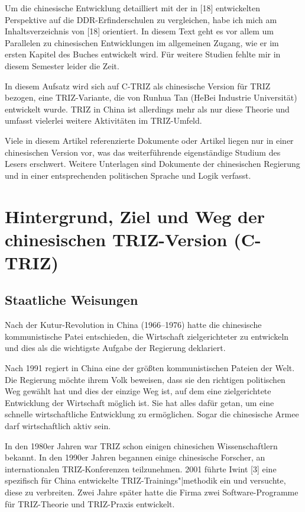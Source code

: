 \documentclass[11pt,a4paper]{article}
\begin{document}
Um die chinesische Entwicklung detailliert mit der in [18] entwickelten
Perspektive auf die DDR-Erfinderschulen zu vergleichen, habe ich mich am
Inhaltsverzeichnis von [18] orientiert.  In diesem Text geht es vor allem um
Parallelen zu chinesischen Entwicklungen im allgemeinen Zugang, wie er im
ersten Kapitel des Buches entwickelt wird.  Für weitere Studien fehlte mir
in diesem Semester leider die Zeit.

In diesem Aufsatz wird sich auf C-TRIZ als chinesische Version für TRIZ
bezogen, eine TRIZ-Variante, die von Runhua Tan (HeBei Industrie Universität)
entwickelt wurde. TRIZ in China ist allerdings mehr als nur diese Theorie und
umfasst vielerlei weitere Aktivitäten im TRIZ-Umfeld. 

Viele in diesem Artikel referenzierte Dokumente oder Artikel liegen nur in
einer chinesischen Version vor, was das weiterführende eigenständige Studium
des Lesers erschwert. Weitere Unterlagen sind Dokumente der chinesischen
Regierung und in einer entsprechenden politischen Sprache und Logik verfasst.

\section{Hintergrund, Ziel und Weg der chinesischen TRIZ-Version (C-TRIZ)}

\subsection{Staatliche Weisungen}
Nach der Kutur-Revolution in China (1966--1976) hatte die chinesische
kommunistische Patei entschieden, die Wirtschaft zielgerichteter zu entwickeln
und dies als die wichtigste Aufgabe der Regierung deklariert.

Nach 1991 regiert in China eine der größten kommunistischen Pateien der Welt.
Die Regierung möchte ihrem Volk beweisen, dass sie den richtigen politischen
Weg gewählt hat und dies der einzige Weg ist, auf dem eine zielgerichtete
Entwicklung der Wirtschaft möglich ist. Sie hat alles dafür getan, um eine
schnelle wirtschaftliche Entwicklung zu ermöglichen. Sogar die chinesische
Armee darf wirtschaftlich aktiv sein.

In den 1980er Jahren war TRIZ schon einigen chinesichen Wissenschaftlern
bekannt.  In den 1990er Jahren begannen einige chinesische Forscher, an
internationalen TRIZ-Konferenzen teilzunehmen. 2001 führte Iwint [3] eine
spezifisch für China entwickelte TRIZ-Trainings"|methodik ein und versuchte,
diese zu verbreiten. Zwei Jahre später hatte die Firma zwei Software-Programme
für TRIZ-Theorie und TRIZ-Praxis entwickelt.
\end{document}
